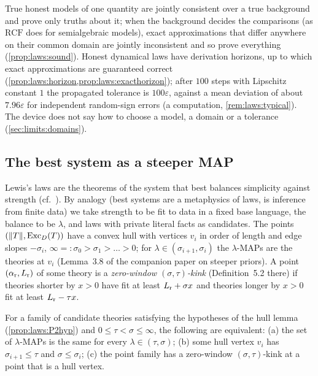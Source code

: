 True honest models of one quantity are jointly consistent over a true background and prove only truths about it; when the background decides the comparisons (as $\mathrm{RCF}$ does for semialgebraic models), exact approximations that differ anywhere on their common domain are jointly inconsistent and so prove everything (\cref{prop:laws:sound}). Honest dynamical laws have derivation horizons, up to which exact approximations are guaranteed correct (\cref{prop:laws:horizon,prop:laws:exacthorizon}); after $100$ steps with Lipschitz constant $1$ the propagated tolerance is $100\varepsilon$, against a mean deviation of about $7.96\varepsilon$ for independent random-sign errors (a computation, \cref{rem:laws:typical}). The device does not say how to choose a model, a domain or a tolerance (\cref{sec:limits:domains}).

\subsection{The best system as a steeper MAP}\label{sec:laws:best}

Lewis's laws are the theorems of the system that best balances simplicity against strength (cf.\ \citealp{lewis1983new,lewis1994humean}). By analogy (best systems are a metaphysics of laws, \SAIabbr is inference from finite data) we take strength to be fit to data in a fixed base language, the balance to be $\lambda$, and laws with private literal facts as candidates. The points $(\lVert T\rVert,\mathrm{Exc}_D(T))$ have a convex hull with vertices $v_i$ in order of length and edge slopes $-\sigma_i$, $\infty=:\sigma_0>\sigma_1>\dots>0$; for $\lambda\in(\sigma_{i+1},\sigma_i)$ the $\lambda$-MAPs are the theories at $v_i$ (Lemma~3.8 of the companion paper on steeper priors). A point $(\alpha_{\rm r},L_{\rm r})$ of some theory is a \emph{zero-window $(\sigma,\tau)$-kink} (Definition~5.2 there) if theories shorter by $x>0$ have fit at least $L_{\rm r}+\sigma x$ and theories longer by $x>0$ fit at least $L_{\rm r}-\tau x$.

\begin{proposition}\label{prop:laws:kink}
For a family of candidate theories satisfying the hypotheses of the hull lemma (\cref{prop:laws:P2hyp}) and $0\le\tau<\sigma\le\infty$, the following are equivalent: (a) the set of $\lambda$-MAPs is the same for every $\lambda\in(\tau,\sigma)$; (b) some hull vertex $v_i$ has $\sigma_{i+1}\le\tau$ and $\sigma\le\sigma_i$; (c) the point family has a zero-window $(\sigma,\tau)$-kink at a point that is a hull vertex.
\end{proposition}

